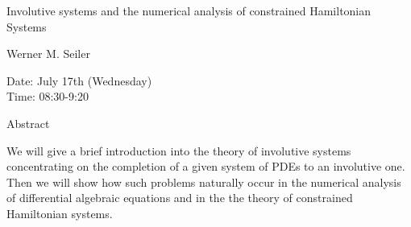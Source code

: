 \begin{center}
\LARGE
Involutive systems and the numerical analysis of constrained
                      Hamiltonian Systems
\end{center}

\begin{center}
\Large
Werner M. Seiler

\end{center}

\noindent
Date:  July 17th (Wednesday)\\
Time:  08:30-9:20\\

\begin{center}
\large
Abstract
\end{center}

We will give a brief introduction into the theory of involutive systems concentrating on the
completion of a given system of PDEs to an involutive one. Then we will show how such problems
naturally occur in the numerical analysis of differential algebraic equations and in the the theory
of constrained Hamiltonian systems. 

